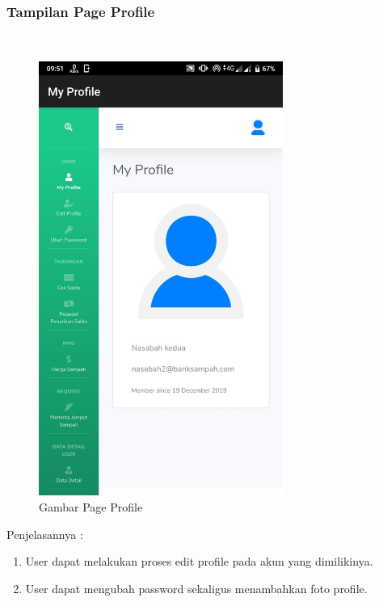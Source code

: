 \subsubsection{Tampilan Page Profile}
\hfill\\
	\begin{figure}[H]
		\includegraphics[width=8cm]{figures/analisis/36.png}
		\centering
		\caption{Gambar Page Profile}
	\end{figure}
Penjelasannya :
\begin{enumerate}
\item User dapat melakukan proses edit profile pada akun yang dimilikinya.
\item User dapat mengubah password sekaligus menambahkan foto profile.
\end{enumerate}

